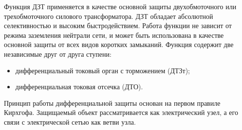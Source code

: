 \begin{flushleft}
\color{black}
\nopagebreak
\vspace{3mm}
\end{flushleft}


\begin{flushleft}
\color{black}
\nopagebreak
\end{flushleft}

Функция ДЗТ применяется в качестве основной защиты двухобмоточного или трехобмоточного силового трансформатора. ДЗТ обладает абсолютной селективностью и высоким быстродействием. Работа функции не зависит от режима заземления нейтрали сети, и может быть использована в качестве основной защиты от всех видов коротких замыканий. Функция содержит две независимые друг от друга ступени:
\begin{itemize}
\item дифференциальный токовый орган с торможением (ДТЗт);
\item дифференциальная токовая отсечка (ДТО).
\end{itemize}


\begin{flushleft}
\color{black}
\nopagebreak
\end{flushleft}

Принцип работы дифференциальной защиты основан на первом правиле Кирхгофа. Защищаемый объект рассматривается как электрический узел, а его связи с электрической сетью как ветви узла.

